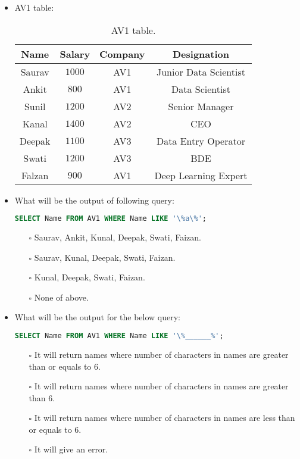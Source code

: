 \documentclass[10pt]{article}
\newcommand{\lightrule}{%
	\arrayrulecolor{black!30}%
	\midrule[\lightrulewidth]%
	\arrayrulecolor{black}}
\begin{document}
\begin{itemize}
			\item AV1 table:	
				\begin{table}[H]
					\centering
					\begin{tabular}{@{} *{4}{c} @{}}
						\toprule
							\textbf{Name} & \textbf{Salary} & \textbf{Company} & \textbf{Designation} \\
						\midrule
							Saurav & $1000$ & AV1 & Junior Data Scientist \\ 
						\lightrule
							Ankit & $800$ & AV1 & Data Scientist \\ 
						\lightrule
							Sunil & $1200$ & AV2 & Senior Manager \\ 
						\lightrule
							Kanal & $1400$ & AV2 & CEO \\ 
						\lightrule
							Deepak & $1100$ & AV3 & Data Entry Operator \\ 
						\lightrule
							Swati & $1200$ & AV3 & BDE \\ 
						\lightrule
							Falzan & $900$ & AV1 & Deep Learning Expert \\ 
						\bottomrule
					\end{tabular}
					\caption{AV1 table.}
				\end{table}

			\item What will be the output of following query: 
				\begin{lstlisting}[language=SQL,firstline=1, lastline=1] 
					SELECT Name FROM AV1 WHERE Name LIKE '\%a\%';
				\end{lstlisting}

				\begin{enumerate}
					\item[$\square$]  Saurav, Ankit, Kunal, Deepak, Swati, Faizan.
					\item[$\square$] Saurav, Kunal, Deepak, Swati, Faizan.
					\item[$\square$]  Kunal, Deepak, Swati, Faizan.
					\item[$\square$]  None of above.
				\end{enumerate}

			\newpage
				
			\item What will be the output for the below query:
				\begin{lstlisting}[language=SQL,firstline=1, lastline=1] 
					SELECT Name FROM AV1 WHERE Name LIKE '\%______%';
				\end{lstlisting}

				\begin{enumerate}
					\item[$\square$] It will return names where number of characters in names are greater than or equals to 6.
					\item[$\square$] It will return names where number of characters in names are greater than 6.
					\item[$\square$] It will return names where number of characters in names are less than or equals to 6.
					\item[$\square$] It will give an error.
				\end{enumerate}


\end{itemize}
\end{document}
